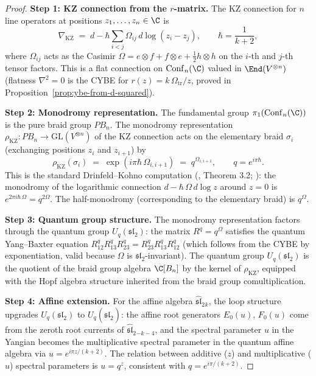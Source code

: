 \begin{proof}
\textbf{Step 1: KZ connection from the $r$-matrix.}
The KZ connection for $n$ line operators at positions
$z_1,\ldots,z_n\in\C$ is
\begin{equation}
\nabla_{\mathrm{KZ}}
\;=\;
d-\hbar\sum_{i<j}
\Omega_{ij}\,d\log(z_i-z_j),
\qquad
\hbar=\frac{1}{k+2},
\end{equation}
where $\Omega_{ij}$ acts as the Casimir
$\Omega=e\otimes f+f\otimes e+\tfrac12 h\otimes h$
on the $i$-th and $j$-th tensor factors. This is a flat
connection on $\mathrm{Conf}_n(\C)$ valued in
$\End(V^{\otimes n})$ (flatness $\nabla^2=0$ is
the CYBE for $r(z)=k\,\Omega_{\mathrm{tr}}/z$, proved in
Proposition~\ref{prop:ybe-from-d-squared}).

\textbf{Step 2: Monodromy representation.}
The fundamental group
$\pi_1(\mathrm{Conf}_n(\C))$ is the pure braid group
$PB_n$. The monodromy representation
$\rho_{\mathrm{KZ}}\colon PB_n\to\mathrm{GL}(V^{\otimes n})$
of the KZ connection acts on the elementary braid
$\sigma_i$ (exchanging positions $z_i$ and $z_{i+1}$)
by
\begin{equation}
\rho_{\mathrm{KZ}}(\sigma_i)
\;=\;
\exp(i\pi\hbar\,\Omega_{i,i+1})
\;=\;
q^{\Omega_{i,i+1}},
\qquad
q=e^{i\pi\hbar}.
\end{equation}
This is the standard Drinfeld--Kohno computation
(\cite{Dri89}, Theorem 3.2; \cite{KL93}): the monodromy
of the logarithmic connection $d-\hbar\,\Omega\,d\log z$
around $z=0$ is $e^{2\pi i\hbar\,\Omega}=q^{2\Omega}$.
The half-monodromy (corresponding to the elementary braid)
is $q^{\Omega}$.

\textbf{Step 3: Quantum group structure.}
The monodromy representation factors through the
quantum group $U_q(\mathfrak{sl}_2)$: the matrix
$R^q=q^{\Omega}$ satisfies the quantum Yang--Baxter
equation
$R^q_{12}R^q_{13}R^q_{23}
=R^q_{23}R^q_{13}R^q_{12}$
(which follows from the CYBE by exponentiation, valid
because $\Omega$ is $\mathfrak{sl}_2$-invariant). The
quantum group $U_q(\mathfrak{sl}_2)$ is the quotient of
the braid group algebra $\C[B_n]$ by the kernel of
$\rho_{\mathrm{KZ}}$, equipped with the Hopf algebra
structure inherited from the braid group comultiplication.

\textbf{Step 4: Affine extension.}
For the affine algebra
$\widehat{\mathfrak{sl}}_2{}_k$, the loop structure
upgrades $U_q(\mathfrak{sl}_2)$ to
$U_q(\widehat{\mathfrak{sl}}_2)$: the affine root
generators $E_0(u)$, $F_0(u)$ come from the zeroth
root currents of $\widehat{\mathfrak{sl}}_2{}_{-k-4}$,
and the spectral parameter $u$ in the Yangian becomes
the multiplicative spectral parameter in the quantum
affine algebra via $u=e^{i\pi z/(k+2)}$. The
relation between additive ($z$) and multiplicative ($u$)
spectral parameters is
$u=q^z$, consistent with $q=e^{i\pi/(k+2)}$.
\end{proof}

